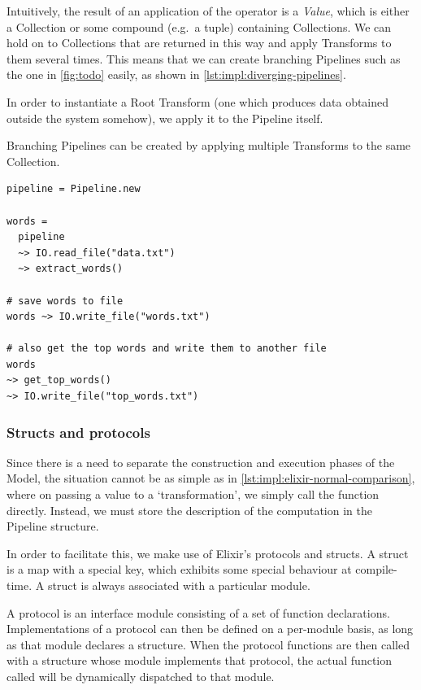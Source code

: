 Intuitively, the result of an application of the \exs{~>} operator is a \emph{Value}, which is either a Collection or some compound (e.g.\ a tuple) containing Collections.
We can hold on to Collections that are returned in this way and apply Transforms to them several times.
This means that we can create branching Pipelines such as the one in \cref{fig:todo} easily, as shown in \cref{lst:impl:diverging-pipelines}.

In order to instantiate a Root Transform (one which produces data obtained outside the system somehow), we apply it to the Pipeline itself.

\begin{listing}[h]
	\caption{Branching Pipelines can be created by applying multiple Transforms to the same Collection.}
	\label{lst:impl:diverging-pipelines}
	\begin{verbatim}
pipeline = Pipeline.new

words =
  pipeline
  ~> IO.read_file("data.txt")
  ~> extract_words()
  
# save words to file
words ~> IO.write_file("words.txt")

# also get the top words and write them to another file
words
~> get_top_words()
~> IO.write_file("top_words.txt")
	\end{verbatim}
\end{listing}

\subsubsection{Structs and protocols}

Since there is a need to separate the construction and execution phases of the Model, the situation cannot be as simple as in \cref{lst:impl:elixir-normal-comparison}, where on passing a value to a `transformation', we simply call the function directly.
Instead, we must store the description of the computation in the Pipeline structure.

In order to facilitate this, we make use of Elixir's protocols and structs.
A struct is a map with a special  key, which exhibits some special behaviour at compile-time.
A struct is always associated with a particular module.

A protocol is an interface module consisting of a set of function declarations.
Implementations of a protocol can then be defined on a per-module basis, as long as that module declares a structure.
When the protocol functions are then called with a structure whose module implements that protocol, the actual function called will be dynamically dispatched to that module.

